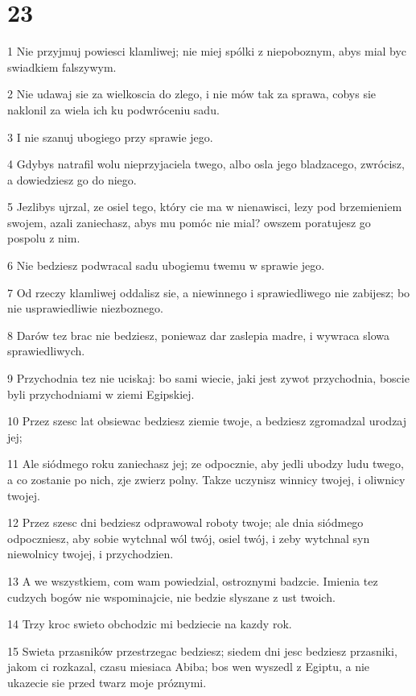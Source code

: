 \chapter{23}

\par 1 Nie przyjmuj powiesci klamliwej; nie miej spólki z niepoboznym, abys mial byc swiadkiem falszywym.
\par 2 Nie udawaj sie za wielkoscia do zlego, i nie mów tak za sprawa, cobys sie naklonil za wiela ich ku podwróceniu sadu.
\par 3 I nie szanuj ubogiego przy sprawie jego.
\par 4 Gdybys natrafil wolu nieprzyjaciela twego, albo osla jego bladzacego, zwrócisz, a dowiedziesz go do niego.
\par 5 Jezlibys ujrzal, ze osiel tego, który cie ma w nienawisci, lezy pod brzemieniem swojem, azali zaniechasz, abys mu pomóc nie mial? owszem poratujesz go pospolu z nim.
\par 6 Nie bedziesz podwracal sadu ubogiemu twemu w sprawie jego.
\par 7 Od rzeczy klamliwej oddalisz sie, a niewinnego i sprawiedliwego nie zabijesz; bo nie usprawiedliwie niezboznego.
\par 8 Darów tez brac nie bedziesz, poniewaz dar zaslepia madre, i wywraca slowa sprawiedliwych.
\par 9 Przychodnia tez nie uciskaj: bo sami wiecie, jaki jest zywot przychodnia, boscie byli przychodniami w ziemi Egipskiej.
\par 10 Przez szesc lat obsiewac bedziesz ziemie twoje, a bedziesz zgromadzal urodzaj jej;
\par 11 Ale siódmego roku zaniechasz jej; ze odpocznie, aby jedli ubodzy ludu twego, a co zostanie po nich, zje zwierz polny. Takze uczynisz winnicy twojej, i oliwnicy twojej.
\par 12 Przez szesc dni bedziesz odprawowal roboty twoje; ale dnia siódmego odpoczniesz, aby sobie wytchnal wól twój, osiel twój, i zeby wytchnal syn niewolnicy twojej, i przychodzien.
\par 13 A we wszystkiem, com wam powiedzial, ostroznymi badzcie. Imienia tez cudzych bogów nie wspominajcie, nie bedzie slyszane z ust twoich.
\par 14 Trzy kroc swieto obchodzic mi bedziecie na kazdy rok.
\par 15 Swieta przasników przestrzegac bedziesz; siedem dni jesc bedziesz przasniki, jakom ci rozkazal, czasu miesiaca Abiba; bos wen wyszedl z Egiptu, a nie ukazecie sie przed twarz moje próznymi.
